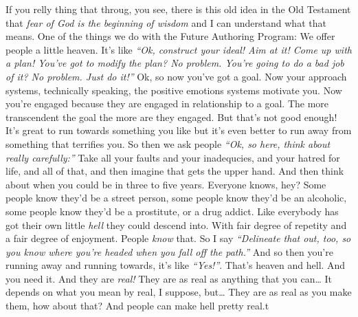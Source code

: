 \documentclass{memoir}
\newcommand{\qq}[1]{\emph{“#1”}}
\begin{document}
\begin{drama}
		If you relly thing that throug, you see, there is this old idea in the Old Testament that \emph{fear of God is the beginning of wisdom} and I can understand what that means. One of the things we do with the Future Authoring Program: We offer people a little heaven. It's like \qq{Ok, construct your ideal! Aim at it! Come up with a plan! You've got to modify the plan? No problem. You're going to do a bad job of it? No problem. Just do it!} Ok, so now you've got a goal. Now your approach systems, technically speaking, the positive emotions systems motivate you. Now you're engaged because they are engaged in relationship to a goal. The more transcendent the goal the more are they engaged. But that's not good enough! It's great to run towards something you like but it's even better to run away from something that terrifies you. So then we ask people \qq{Ok, so here, think about really carefully:} Take all your faults and your inadequcies, and your hatred for life, and all of that, and then imagine that gets the upper hand. And then think about when you could be in three to five years. Everyone knows, hey? Some people know they'd be a street person, some people know they'd be an alcoholic, some people know they'd be a prostitute, or a drug addict. Like everybody has got their own little \emph{hell} they could descend into. With fair degree of repetity and a fair degree of enjoyment. People \emph{know} that. So I say \qq{Delineate that out, too, so you know where you're headed when you fall off the path.} And so then you're running away and running towards, it's like \qq{Yes!}. That's heaven and hell. And you need it. And they are \emph{real!} They are as real as anything that you can\ldots{} It depends on what you mean by real, I suppose, but\ldots{} They are as real as you make them, how about that? And people can make hell pretty real.t 

\end{drama}
\end{document}

